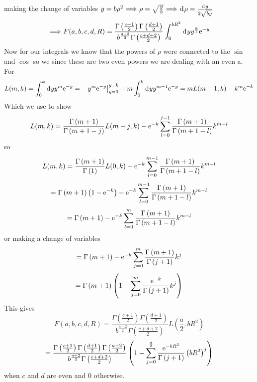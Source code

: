 \documentclass[11pt]{amsart}
\makeatletter
\newcommand{\e}{{\rm e}}				%
\newcommand{\msp}[1]{\mspace{#1mu}}		%
\newcommand{\0}{\varnothing}		%
\DeclareMathOperator*{\im}{\, \Longrightarrow \,}	%
\newcommand{\dd}{\msp{1} {\rm{d}} \msp{1}}	%
\newcommand{\1}{!}
\newcommand{\2}{@}
\newcommand{\3}{\#}
\newcommand{\4}{\$}
\newcommand{\5}{\%}
\newcommand{\6}{$^\wedge$}
\newcommand{\7}{\&}
\newcommand{\8}{*}
\newcommand{\9}{(}
\makeatother
\begin{document}
making the change of variables $y = b\rho^2\im \rho = \sqrt{\frac{y}{b}}\im \dd \rho =\frac{\dd y}{2\sqrt{by}}$
\[
\im F(a,b,c,d,R) = \frac{\Gamma\left(\frac{c+1}{2}\right)\Gamma\left(\frac{d+1}{2}\right)}{b^{\frac{a+2}{2}}\Gamma\left(\frac{c+d+2}{2}\right)}\int_0^{bR^2}\dd y y^{\frac{a}{2}}\e^{-y}
\]
Now for our integrals we know that the powers of $\rho$ were connected to the $\sin$ and $\cos$ so we since these are two even powers we are dealing with an even a. For 
\[
L(m,k) = \int_0^k\dd y y^m\e^{-y} = \left.-y^m\e^{-y}\right|_{y=0}^{y=k} + m\int_0^k\dd y y^{m-1}\e^{-y} = mL(m-1,k)-k^m\e^{-k}
\]
Which we use to show
\[
L(m,k) = \frac{\Gamma\left(m+1\right)}{\Gamma\left(m+1-j\right)}L(m-j,k)-\e^{-k}\sum_{l=0}^{j-1}\frac{\Gamma\left(m+1\right)}{\Gamma\left(m+1-l\right)}k^{m-l}
\]
so
\[
L(m,k) = \frac{\Gamma\left(m+1\right)}{\Gamma\left(1\right)}L(0,k)-\e^{-k}\sum_{l=0}^{m-1}\frac{\Gamma\left(m+1\right)}{\Gamma\left(m+1-l\right)}k^{m-l}
\]
\[
=\Gamma\left(m+1\right)\left(1-\e^{-k}\right)-\e^{-k}\sum_{l=0}^{m-1}\frac{\Gamma\left(m+1\right)}{\Gamma\left(m+1-l\right)}k^{m-l}
\]
\[
=\Gamma\left(m+1\right)-\e^{-k}\sum_{l=0}^{m}\frac{\Gamma\left(m+1\right)}{\Gamma\left(m+1-l\right)}k^{m-l}
\]
or making a change of variables
\[
=\Gamma\left(m+1\right) - \e^{-k}\sum_{j=0}^m\frac{\Gamma\left(m+1\right)}{\Gamma\left(j+1\right)}k^j
\]
\[
=\Gamma\left(m+1\right)\left(1-\sum_{j=0}^m\frac{\e^{-k}}{\Gamma\left(j+1\right)}k^j\right)
\]
This gives
\[
F(a,b,c,d,R) = \frac{\Gamma\left(\frac{c+1}{2}\right)\Gamma\left(\frac{d+1}{2}\right)}{b^{\frac{a+2}{2}}\Gamma\left(\frac{c+d+2}{2}\right)}L\left(\frac{a}{2},bR^2\right)
\]
\[
 = \frac{\Gamma\left(\frac{c+1}{2}\right)\Gamma\left(\frac{d+1}{2}\right)\Gamma\left(\frac{a+2}{2}\right)}{b^{\frac{a+2}{2}}\Gamma\left(\frac{c+d+2}{2}\right)}\left(1-\sum_{j=0}^{\frac{a}{2}}\frac{\e^{-bR^2}}{\Gamma\left(j+1\right)}\left(bR^2\right)^j\right)
\]
when $c$ and $d$ are even and 0 otherwise.
\newpage
\end{document}
